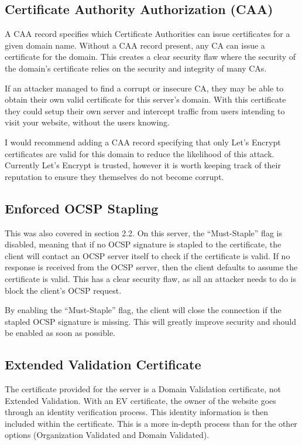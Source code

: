 \documentclass[12pt]{article}
\begin{document}
  \subsection{Certificate Authority Authorization (CAA)}
  A CAA record specifies which Certificate Authorities can issue certificates for a given domain name.
  Without a CAA record present, any CA can issue a certificate for the domain.
  This creates a clear security flaw where the security of the domain's certificate relies on the security and integrity of many CAs.
  
  If an attacker managed to find a corrupt or insecure CA, they may be able to obtain their own valid certificate for this server's domain.
  With this certificate they could setup their own server and intercept traffic from users intending to visit your website, without the users knowing.

  I would recommend adding a CAA record specifying that only Let's Encrypt certificates are valid for this domain to reduce the likelihood of this attack.
  Currently Let's Encrypt is trusted, however it is worth keeping track of their reputation to ensure they themselves do not become corrupt.


  \subsection{Enforced OCSP Stapling}
  This was also covered in section 2.2.
  On this server, the ``Must-Staple'' flag is disabled, meaning that if no OCSP signature is stapled to the certificate, the client will contact an OCSP server itself to check if the certificate is valid.
  If no response is received from the OCSP server, then the client defaults to assume the certificate is valid.
  This has a clear security flaw, as all an attacker needs to do is block the client's OCSP request.

  By enabling the ``Must-Staple'' flag, the client will close the connection if the stapled OCSP signature is missing.
  This will greatly improve security and should be enabled as soon as possible.


  \subsection{Extended Validation Certificate}
  The certificate provided for the server is a Domain Validation certificate, not Extended Validation.
  With an EV certificate, the owner of the website goes through an identity verification process.
  This identity information is then included within the certificate.
  This is a more in-depth process than for the other options (Organization Validated and Domain Validated).
\end{document}
